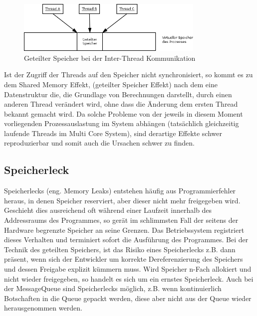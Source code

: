 \documentclass[12pt,oneside,a4paper,bibtotoc,liststotoc]{scrreprt}
\begin{document}
\begin{figure}[H]
  \begin{centering}
    \includegraphics[width=0.8\textwidth]{img/SharedMemory_RaceCondition.png}
    \caption{Geteilter Speicher bei der Inter-Thread Kommunikation}
    \label{SharedMemory_RaceCondition}
  \end{centering}
\end{figure}
Ist der Zugriff der Threads auf den Speicher nicht synchronisiert, so kommt es zu dem Shared Memory Effekt, (geteilter Speicher Effekt) nach dem eine Datenstruktur die, die Grundlage von Berechnungen darstellt, durch einen anderen Thread verändert wird, ohne dass die Änderung dem ersten Thread bekannt gemacht wird. Da solche Probleme von der jeweils in diesem Moment vorliegenden Prozessauslastung im System abhängen (tatsächlich gleichzeitig laufende Threads im Multi Core System), sind derartige Effekte schwer reproduzierbar und somit auch die Ursachen schwer zu finden.


\subsection{Speicherleck}
Speicherlecks (eng. Memory Leaks) entstehen häufig aus Programmierfehler heraus, in denen Speicher reserviert, aber dieser nicht mehr freigegeben wird. Geschieht dies ausreichend oft während einer Laufzeit innerhalb des Addressraums des Programmes, so gerät im schlimmsten Fall der seitens der Hardware begrenzte Speicher an seine Grenzen. Das Betriebssystem registriert dieses Verhalten und terminiert sofort die Ausführung des Programmes. Bei der Technik des geteilten Speichers, ist das Risiko eines Speicherlecks z.B. dann präsent, wenn sich der Entwickler um korrekte Dereferenzierung des Speichers und dessen Freigabe explizit kümmern muss. Wird Speicher n-Fach allokiert und nicht wieder freigegeben, so handelt es sich um ein ernstes Speicherleck. Auch bei der MessageQueue sind Speicherlecks möglich, z.B. wenn kontinuierlich Botschaften in die Queue gepackt werden, diese aber nicht aus der Queue wieder herausgenommen werden.
\end{document}
